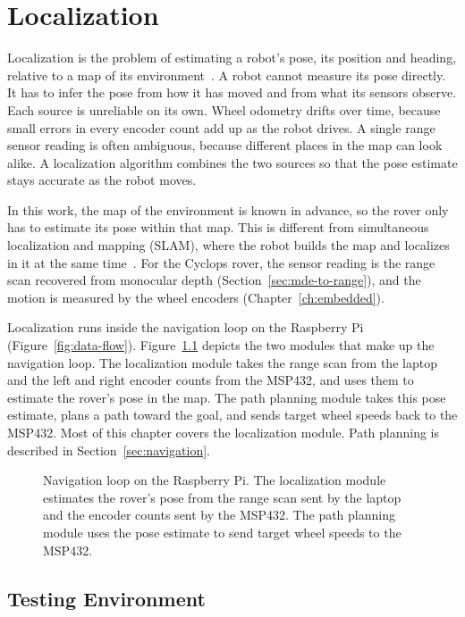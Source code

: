 \chapter{Localization}
\label{ch:localization}
Localization is the problem of estimating a robot's pose, its position and heading,
relative to a map of its environment~\cite{thrun2005probabilistic}. A robot cannot measure
its pose directly. It has to infer the pose from how it has moved and from what its sensors
observe. Each source is unreliable on its own. Wheel odometry drifts over time, because
small errors in every encoder count add up as the robot drives. A single range sensor reading is
often ambiguous, because different places in the map can look alike. A localization
algorithm combines the two sources so that the pose estimate stays accurate as the robot
moves.

In this work, the map of the environment is known in advance, so the rover only has to
estimate its pose within that map. This is different from simultaneous localization and
mapping (SLAM), where the robot builds the map and localizes in it at the same
time~\cite{durrantwhyte2006slam}. For the Cyclops rover, the sensor reading 
is the range scan recovered from
monocular depth (Section~\ref{sec:mde-to-range}), and the motion is measured by the wheel
encoders (Chapter~\ref{ch:embedded}).

Localization runs inside the navigation loop on the Raspberry Pi
(Figure~\ref{fig:data-flow}). Figure~\ref{fig:nav-loop} depicts the two modules that make up
the navigation loop. The localization module takes the range scan from the laptop and the
left and right encoder counts from the MSP432, and uses them to estimate the rover's pose in
the map. The path planning module takes this pose estimate, plans a path toward the goal,
and sends target wheel speeds back to the MSP432. Most of this chapter covers the
localization module. Path planning is described in Section~\ref{sec:navigation}.


\begin{figure}[htbp]
  \centering
  
  \caption[Navigation loop on the Raspberry Pi]{Navigation loop on the Raspberry Pi. The
    localization module estimates the rover's pose from the range scan sent by the laptop
    and the encoder counts sent by the MSP432. The path planning module uses the pose
    estimate to send target wheel speeds to the MSP432.}
  \label{fig:nav-loop}
\end{figure}

\section{Testing Environment}
\label{sec:test-env}


